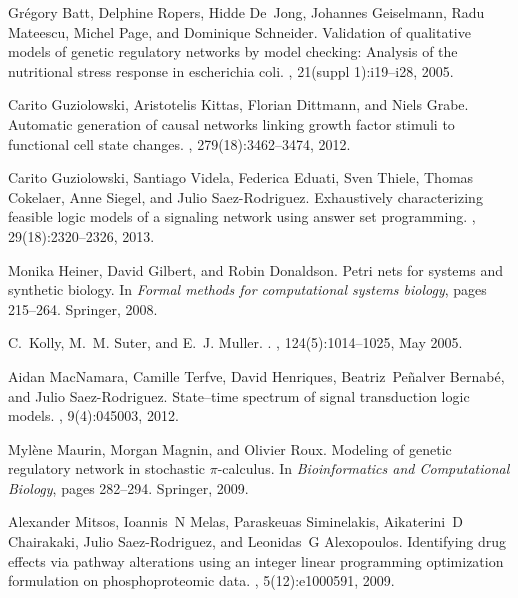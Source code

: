 \documentclass[runningheads,a4paper]{llncs}
\begin{document}
\begin{thebibliography}{4}

Gr{\'e}gory Batt, Delphine Ropers, Hidde De~Jong, Johannes Geiselmann, Radu
  Mateescu, Michel Page, and Dominique Schneider.
\newblock Validation of qualitative models of genetic regulatory networks by
  model checking: Analysis of the nutritional stress response in escherichia
  coli.
, 21(suppl 1):i19--i28, 2005.

Carito Guziolowski, Aristotelis Kittas, Florian Dittmann, and Niels Grabe.
\newblock Automatic generation of causal networks linking growth factor stimuli
  to functional cell state changes.
, 279(18):3462--3474, 2012.

Carito Guziolowski, Santiago Videla, Federica Eduati, Sven Thiele, Thomas
  Cokelaer, Anne Siegel, and Julio Saez-Rodriguez.
\newblock Exhaustively characterizing feasible logic models of a signaling
  network using answer set programming.
, 29(18):2320--2326, 2013.

Monika Heiner, David Gilbert, and Robin Donaldson.
\newblock Petri nets for systems and synthetic biology.
\newblock In {\em Formal methods for computational systems biology}, pages
  215--264. Springer, 2008.

C.~Kolly, M.~M. Suter, and E.~J. Muller.
.
, 124(5):1014--1025, May 2005.

Aidan MacNamara, Camille Terfve, David Henriques, Beatriz~Pe{\~n}alver
  Bernab{\'e}, and Julio Saez-Rodriguez.
\newblock State--time spectrum of signal transduction logic models.
, 9(4):045003, 2012.

Myl{\`e}ne Maurin, Morgan Magnin, and Olivier Roux.
\newblock Modeling of genetic regulatory network in stochastic $\pi$-calculus.
\newblock In {\em Bioinformatics and Computational Biology}, pages 282--294.
  Springer, 2009.

Alexander Mitsos, Ioannis~N Melas, Paraskeuas Siminelakis, Aikaterini~D
  Chairakaki, Julio Saez-Rodriguez, and Leonidas~G Alexopoulos.
\newblock Identifying drug effects via pathway alterations using an integer
  linear programming optimization formulation on phosphoproteomic data.
, 5(12):e1000591, 2009.


\end{thebibliography}
\end{document}
